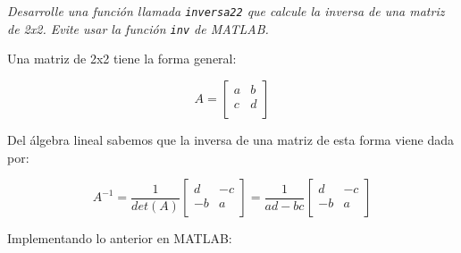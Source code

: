 \textit{Desarrolle una función llamada \texttt{inversa22} que calcule la inversa de una matriz de 2x2. Evite usar 
la función \texttt{inv} de MATLAB.}

\sol

Una matriz de 2x2 tiene la forma general:

$$
A=\left[
\begin{array}{cc}
a & b \\
c & d \\
\end{array}
\right]
$$

Del álgebra lineal sabemos que la inversa de una matriz de esta forma viene dada por:

$$
A^{-1}=\frac{1}{det(A)}
\left[
\begin{array}{cc}
d & -c \\
-b & a \\
\end{array}
\right] = 
\frac{1}{ad-bc}
\left[ \begin{array}{cc}
d & -c \\
-b & a \\
\end{array} \right]
$$

Implementando lo anterior en MATLAB:

